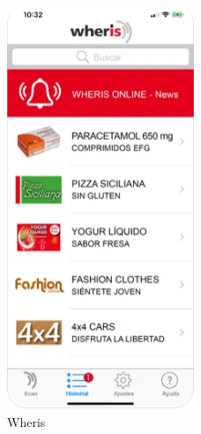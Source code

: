 \begin{figure}[h]
	\centering
	\includegraphics[width=0.5\textwidth]{Imagenes/ProyectosMateriales/wheris}
	\caption{Wheris}
	\label{fig:wheris}\end{figure} 










